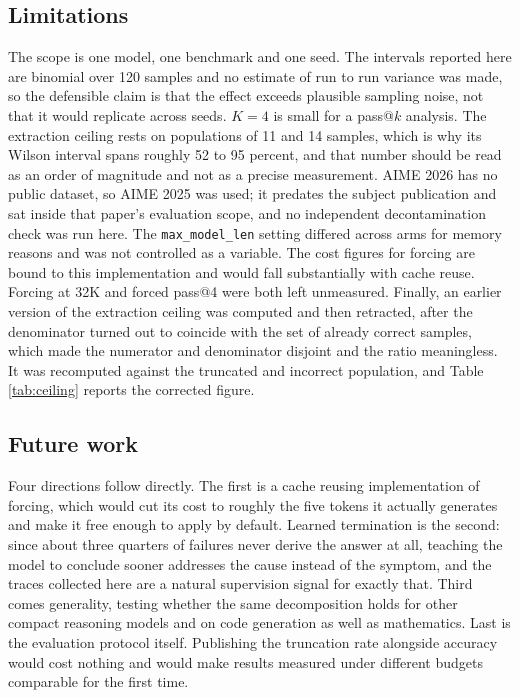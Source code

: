 \documentclass[conference]{IEEEtran}
\begin{document}
\subsection{Limitations}

The scope is one model, one benchmark and one seed. The intervals reported here
are binomial over 120 samples and no estimate of run to run variance was made, so
the defensible claim is that the effect exceeds plausible sampling noise, not that
it would replicate across seeds. $K = 4$ is small for a pass@$k$ analysis. The
extraction ceiling rests on populations of 11 and 14 samples, which is why its
Wilson interval spans roughly 52 to 95 percent, and that number should be read as
an order of magnitude and not as a precise measurement. AIME 2026 has no public dataset,
so AIME 2025 was used; it predates the subject publication and sat inside that
paper's evaluation scope, and no independent decontamination check was run here.
The \texttt{max\_model\_len} setting differed across arms for memory reasons and
was not controlled as a variable. The cost figures for forcing are bound to this
implementation and would fall substantially with cache reuse. Forcing at 32K and
forced pass@4 were both left unmeasured. Finally, an earlier version of the
extraction ceiling was computed and then retracted, after the denominator turned
out to coincide with the set of already correct samples, which made the numerator
and denominator disjoint and the ratio meaningless. It was recomputed against the
truncated and incorrect population, and Table \ref{tab:ceiling} reports the
corrected figure.

\subsection{Future work}

Four directions follow directly. The first is a cache reusing implementation of
forcing, which would cut its cost to roughly the five tokens it actually
generates and make it free enough to apply by default. Learned termination is the
second: since about three quarters of failures never derive the answer at all,
teaching the model to conclude sooner addresses the cause instead of the symptom,
and the traces collected here are a natural supervision signal for exactly that.
Third comes generality, testing whether the same decomposition holds for other
compact reasoning models and on code generation as well as mathematics. Last is
the evaluation protocol itself. Publishing the truncation rate alongside
accuracy would cost nothing and would make results measured under different
budgets comparable for the first time.
\end{document}
